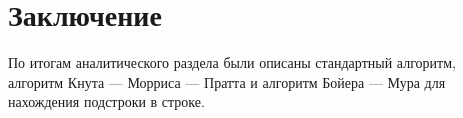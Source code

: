 \chapter*{Заключение}

По итогам аналитического раздела были описаны стандартный алгоритм, алгоритм Кнута — Морриса — Пратта и алгоритм Бойера — Мура для нахождения подстроки в строке.